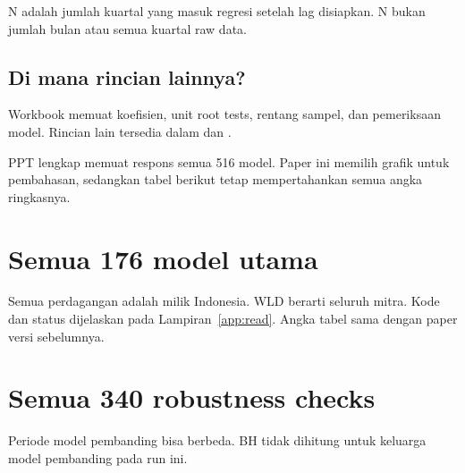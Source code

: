 N adalah jumlah kuartal yang masuk regresi setelah lag disiapkan. N bukan jumlah bulan atau semua kuartal raw data.

\subsection{Di mana rincian lainnya?}
Workbook  memuat koefisien, unit root tests, rentang sampel, dan pemeriksaan model. Rincian lain tersedia dalam  dan .

PPT lengkap memuat respons semua 516 model. Paper ini memilih grafik untuk pembahasan, sedangkan tabel berikut tetap mempertahankan semua angka ringkasnya.

\clearpage\section{Semua 176 model utama}
\noindent Semua perdagangan adalah milik Indonesia. WLD berarti seluruh mitra. Kode dan status dijelaskan pada Lampiran~\ref{app:read}. Angka tabel sama dengan paper versi sebelumnya.


\clearpage\section{Semua 340 robustness checks}
\noindent Periode model pembanding bisa berbeda. BH tidak dihitung untuk keluarga model pembanding pada run ini.


